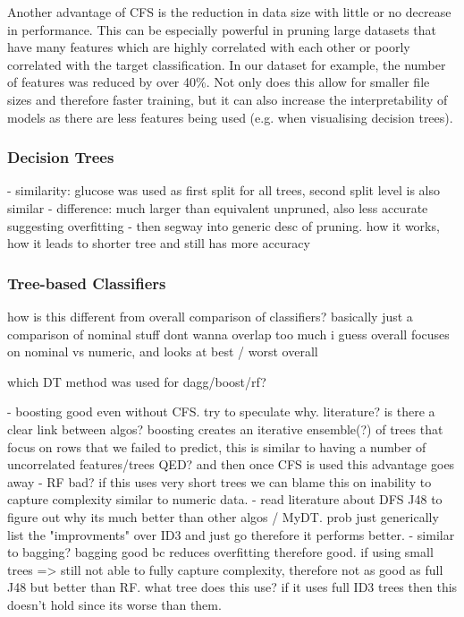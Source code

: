 Another advantage of CFS is the reduction in data size with little or no decrease in performance. This can be especially powerful in pruning large datasets that have many features which are highly correlated with each other  or poorly correlated with the target classification. In our dataset for example, the number of features was reduced by over 40\%. Not only does this allow for smaller file sizes and therefore faster training, but it can also increase the interpretability of models as there are less features being used (e.g. when visualising decision trees).



\subsubsection{Decision Trees}





- similarity: glucose was used as first split for all trees, second split level is also similar
- difference: much larger than equivalent unpruned, also less accurate suggesting overfitting
- then segway into generic desc of pruning. how it works, how it leads to shorter tree and still has more accuracy



\subsubsection{Tree-based Classifiers}


how is this different from overall comparison of classifiers? basically just a comparison of nominal stuff
dont wanna overlap too much
i guess overall focuses on nominal vs numeric, and looks at best / worst overall

which DT method was used for dagg/boost/rf?


- boosting good even without CFS. try to speculate why. literature? is there a clear link between algos? boosting creates an iterative ensemble(?) of trees that focus on rows that we failed to predict, this is similar to having a number of uncorrelated features/trees QED? and then once CFS is used this advantage goes away
- RF bad? if this uses very short trees we can blame this on inability to capture complexity similar to numeric data.
- read literature about DFS J48 to figure out why its much better than other algos / MyDT. prob just generically list the "improvments" over ID3 and just go therefore it performs better.
- similar to bagging? bagging good bc reduces overfitting therefore good. if using small trees => still not able to fully capture complexity, therefore not as good as full J48 but better than RF. what tree does this use? if it uses full ID3 trees then this doesn't hold since its worse than them.


